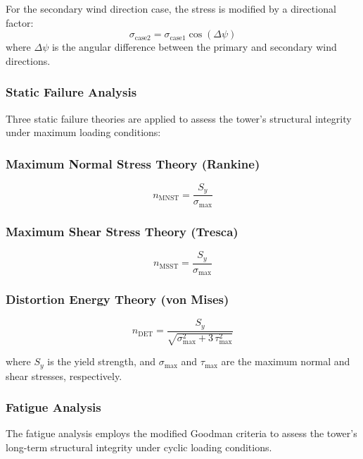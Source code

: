 \documentclass[11pt]{article}
\begin{document}
For the secondary wind direction case, the stress is modified by a directional factor:
\begin{equation}
 \sigma_{\text{case2}} = \sigma_{\text{case1}} \cos(\Delta \psi)
\label{eq:direction_factor}
\end{equation}
where $\Delta\psi$ is the angular difference between the primary and secondary wind directions.

\subsubsection{Static Failure Analysis}

Three static failure theories are applied to assess the tower's structural integrity under maximum loading conditions:

\subsubsection*{Maximum Normal Stress Theory (Rankine)}
\begin{equation}
 n_{\text{MNST}} = \frac{S_y}{\sigma_\text{max}}
\label{eq:mnst}
\end{equation}

\subsubsection*{Maximum Shear Stress Theory (Tresca)}
\begin{equation}
 n_{\text{MSST}} = \frac{S_y}{\sigma_\text{max}}
\label{eq:msst}
\end{equation}

\subsubsection*{Distortion Energy Theory (von Mises)}
\begin{equation}
 n_{\text{DET}} = \frac{S_y}{\sqrt{\sigma_\text{max}^{2} + 3\,\tau_\text{max}^{2}}}
\label{eq:det}
\end{equation}

where $S_y$ is the yield strength, and $\sigma_\text{max}$ and $\tau_\text{max}$ are the maximum normal and shear stresses, respectively.

\subsubsection{Fatigue Analysis}

The fatigue analysis employs the modified Goodman criteria to assess the tower's long-term structural integrity under cyclic loading conditions.
\end{document}
